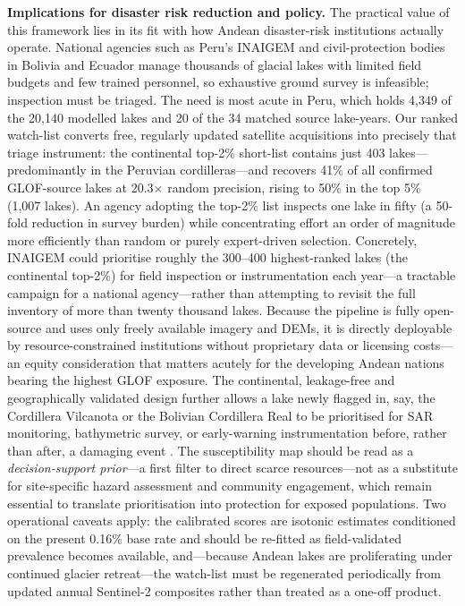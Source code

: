 \documentclass[pdflatex,sn-basic]{sn-jnl}%
\begin{document}
\textbf{Implications for disaster risk reduction and policy.}
The practical value of this framework lies in its fit with how Andean
disaster-risk institutions actually operate. National agencies such as
Peru's INAIGEM \citep{INAIGEM2018} and civil-protection bodies in
Bolivia and Ecuador manage thousands of glacial lakes with limited
field budgets and few trained personnel, so exhaustive ground survey is
infeasible; inspection must be triaged. The need is most acute in Peru,
which holds 4{,}349 of the 20{,}140 modelled lakes and 20 of the 34
matched source lake-years. Our ranked watch-list
converts free, regularly updated satellite acquisitions into precisely
that triage instrument: the continental top-2\% short-list contains just
403 lakes---predominantly in the Peruvian cordilleras---and recovers 41\%
of all confirmed GLOF-source lakes at 20.3$\times$ random precision, rising
to 50\% in the top 5\% (1{,}007 lakes). An agency adopting the top-2\%
list inspects one lake in fifty (a 50-fold reduction in survey burden)
while concentrating effort an order of magnitude more efficiently than
random or purely expert-driven selection. Concretely, INAIGEM could
prioritise roughly the 300--400 highest-ranked lakes (the continental
top-2\%) for field inspection or instrumentation each year---a tractable
campaign for a national agency---rather than attempting to revisit the full
inventory of more than twenty thousand lakes. Because the
pipeline is fully open-source and uses only freely available imagery and
DEMs, it is directly deployable by resource-constrained institutions
without proprietary data or licensing costs---an equity consideration
that matters acutely for the developing Andean nations bearing the
highest GLOF exposure. The continental, leakage-free and
geographically validated design further allows a lake newly flagged in,
say, the Cordillera Vilcanota or the Bolivian Cordillera Real to be
prioritised for SAR monitoring, bathymetric survey, or early-warning
instrumentation before, rather than after, a damaging event
\citep{Pronk2022,GAPHAZ2017}. The susceptibility map should be read as a
\emph{decision-support prior}---a first filter to direct scarce
resources---not as a substitute for site-specific hazard assessment and
community engagement, which remain essential to translate prioritisation
into protection for exposed populations. Two operational caveats apply:
the calibrated scores are isotonic estimates conditioned on the present
0.16\% base rate and should be re-fitted as field-validated prevalence
becomes available, and---because Andean lakes are proliferating under
continued glacier retreat---the watch-list must be regenerated
periodically from updated annual Sentinel-2 composites rather than
treated as a one-off product.
\end{document}
